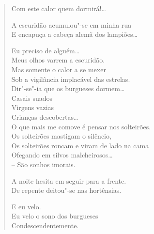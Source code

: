 \begin{verse}
Com este calor quem dormirá!\ldots{}

A escuridão acumulou"-se em minha rua\\
E encapuça a cabeça alemã dos lampiões\ldots{}

Eu preciso de alguém\ldots{}\\
Meus olhos varrem a escuridão.\\
Mas somente o calor a se mexer\\
Sob a vigilância implacável das estrelas.\\
Dir"-se"-ia que os burgueses dormem\ldots{}\\
\qquad\qquad\qquad Casais suados\\
\qquad\qquad\qquad Virgens vazias\\
\qquad\qquad\qquad Crianças descobertas\ldots{}\\
O que mais me comove é pensar nos solteirões.\\
Os solteirões mastigam o silêncio,\\
Os solteirões roncam e viram de lado na cama\\
Ofegando em silvos malcheirosos\ldots{}\\
\quad\qquad\qquad\qquad\qquad -- São sonhos imorais.

A noite hesita em seguir para a frente.\\
De repente deitou"-se nas hortênsias.

E eu velo.\\
Eu velo o sono dos burgueses\\
Condescendentemente.
\end{verse}


